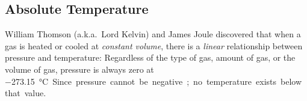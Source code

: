 \subsection{Absolute Temperature}
William Thomson (a.k.a.\ Lord Kelvin) and James Joule discovered that when a
gas is heated or cooled at \emph{constant volume}, there is a \emph{linear}
relationship between pressure and temperature:
Regardless of the type of gas, amount of gas, or the volume of gas, pressure is
always zero at \SI{-273.15}\celsius. Since pressure cannot be negative; no
temperature exists below that value.

